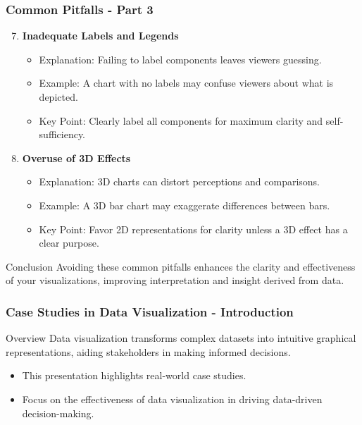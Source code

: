 \documentclass[aspectratio=169]{beamer}
\begin{document}
\begin{frame}[fragile]
    \frametitle{Common Pitfalls - Part 3}
    \begin{enumerate}
        \setcounter{enumi}{6}
        \item \textbf{Inadequate Labels and Legends}
            \begin{itemize}
                \item Explanation: Failing to label components leaves viewers guessing.
                \item Example: A chart with no labels may confuse viewers about what is depicted.
                \item Key Point: Clearly label all components for maximum clarity and self-sufficiency.
            \end{itemize}

        \item \textbf{Overuse of 3D Effects}
            \begin{itemize}
                \item Explanation: 3D charts can distort perceptions and comparisons.
                \item Example: A 3D bar chart may exaggerate differences between bars.
                \item Key Point: Favor 2D representations for clarity unless a 3D effect has a clear purpose.
            \end{itemize}
    \end{enumerate}
    
    \begin{block}{Conclusion}
        Avoiding these common pitfalls enhances the clarity and effectiveness of your visualizations, improving interpretation and insight derived from data.
    \end{block}
\end{frame}

\begin{frame}[fragile]
    \frametitle{Case Studies in Data Visualization - Introduction}
    \begin{block}{Overview}
        Data visualization transforms complex datasets into intuitive graphical representations, aiding stakeholders in making informed decisions. 
    \end{block}
    \begin{itemize}
        \item This presentation highlights real-world case studies.
        \item Focus on the effectiveness of data visualization in driving data-driven decision-making.
    \end{itemize}
\end{frame}
\end{document}
